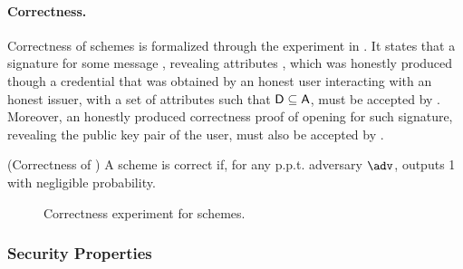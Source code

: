 \paragraph{Correctness.} %
Correctness of \GSAC schemes is formalized through the experiment in
. It states that a signature for some message \msg,
revealing attributes \DAttrs, which was honestly produced though a credential
that was obtained by an honest user interacting with an honest issuer, with a
set of attributes \Attrs such that $\mathsf{D} \subseteq \mathsf{A}$, must be accepted
by \Verify. Moreover, an honestly produced correctness proof of opening for such
signature, revealing the public key pair of the user, must also be accepted by
\Judge.

\begin{definition}{(Correctness of \GSAC)}
  \label{def:correctness-gsac}
  A \GSAC scheme is correct if, for any p.p.t. adversary $\adv$, \ExpGSACCorrect
  outputs 1 with negligible probability.
\end{definition}

\begin{figure}[htp!]
  \caption{Correctness experiment for \GSAC schemes.}
  \label{fig:exp-gsac-corr}
\end{figure}


\subsubsection{Security Properties}
\label{sssec:security-gsac}

